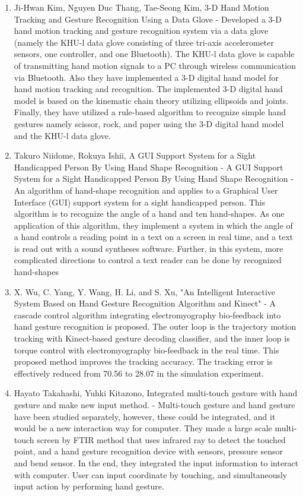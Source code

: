\documentclass[11pt]{report}
\begin{document}
\begin{enumerate}
    \item Ji-Hwan Kim, Nguyen Duc Thang, Tae-Seong Kim, 3-D Hand Motion Tracking and Gesture Recognition Using a Data Glove \cite{4} - Developed a 3-D hand motion tracking and gesture recognition system via a data glove (namely the KHU-l data glove consisting of three tri-axis accelerometer sensors, one controller, and one Bluetooth). The KHU-l data glove is capable of transmitting hand motion signals to a PC through wireless communication via Bluetooth. Also they have implemented a 3-D digital hand model for hand motion tracking and recognition. The implemented 3-D digital hand model is based on the kinematic chain theory utilizing ellipsoids and joints. Finally, they have utilized a rule-based algorithm to recognize simple hand gestures namely scissor, rock, and paper using the 3-D digital hand model and the KHU-l data glove.
    
    \item Takuro Niidome, Rokuya Ishii, A GUI Support System for a Sight Handicapped Person By Using Hand Shape Recognition \cite{5} - A GUI Support System for a Sight Handicapped Person By Using Hand Shape Recognition - An algorithm of hand-shape recognition and applies to a Graphical User Interface (GUI) support system for a sight handicapped person. This algorithm is to recognize the angle of a hand and ten hand-shapes. As one application of this algorithm, they implement a system in which the angle of a hand controls a reading point in a text on a screen in real time, and a text is read out with a sound syntheses software. Further, in this system, more complicated directions to control a text reader can be done by recognized hand-shapes
    
    \item X. Wu, C. Yang, Y. Wang, H. Li, and S. Xu, "An Intelligent Interactive System Based on Hand Gesture Recognition Algorithm and Kinect" \cite{6} - A cascade control algorithm integrating electromyography bio-feedback into hand gesture recognition is proposed. The outer loop is the trajectory motion tracking with Kinect-based gesture decoding classifier, and the inner loop is torque control with electromyography bio-feedback in the real time. This proposed method improves the tracking accuracy. The tracking error is effectively reduced from 70.56 to 28.07 in the simulation experiment.
    
    \item Hayato Takahashi, Yuhki Kitazono, Integrated multi-touch gesture with hand gesture and  make new input method. \cite{7} - Multi-touch gesture and hand gesture have been studied separately, however, these could be integrated, and it would be a new interaction way for computer. They made a large scale multi-touch screen by FTIR method that uses infrared ray to detect the touched point, and a hand gesture recognition device with sensors, pressure  sensor  and  bend  sensor.  In  the  end,  they  integrated  the input  information  to  interact  with  computer. User can input coordinate by touching, and simultaneously input action by performing hand gesture.
    

\end{enumerate}
\end{document}
